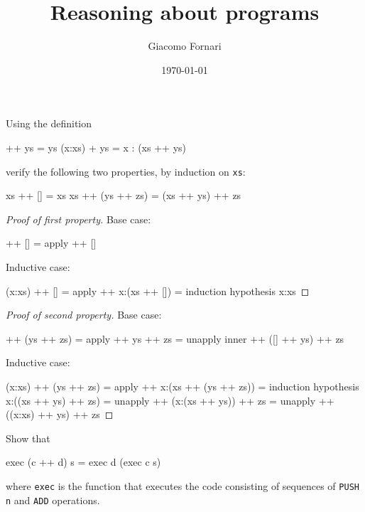 \documentclass[12pt]{article}
\title{Reasoning about programs}
\author{Giacomo Fornari}
\date{\today}
\newenvironment{code}{\endgraf\verbatim}{\endverbatim}
\newenvironment{problem}[2][Problem]{\begin{trivlist}
\item[\hskip \labelsep {\bfseries #1}\hskip \labelsep {\bfseries #2.}]}{\end{trivlist}}
\begin{document}
\maketitle


\begin{problem}{1}
Using the definition

\begin{code}
[] ++ ys = ys
(x:xs) + ys = x : (xs ++ ys)
\end{code}

verify the following two properties, by induction on \verb|xs|:

\begin{code}
xs ++ [] = xs
xs ++ (ys ++ zs) = (xs ++ ys) ++ zs
\end{code}
\end{problem}


\begin{proof}[Proof of first property]
Base case:

\begin{code}
  [] ++ []
=   { apply ++ }
  []
\end{code}

Inductive case:

\begin{code}
  (x:xs) ++ []
=   { apply ++ }
  x:(xs ++ [])
=   { induction hypothesis }
  x:xs
\end{code}
\end{proof}


\begin{proof}[Proof of second property]
Base case:

\begin{code}
  [] ++ (ys ++ zs)
=   { apply ++ }
  ys ++ zs
=   { unapply inner ++ }
  ([] ++ ys) ++ zs
\end{code}

Inductive case:

\begin{code}
  (x:xs) ++ (ys ++ zs)
=   { apply ++ }
  x:(xs ++ (ys ++ zs))
=   { induction hypothesis }
  x:((xs ++ ys) ++ zs)
=   { unapply ++ }
  (x:(xs ++ ys)) ++ zs
=   { unapply ++ }
  ((x:xs) ++ ys) ++ zs
\end{code}
\end{proof}


\begin{problem}{2}
Show that

\begin{code}
exec (c ++ d) s = exec d (exec c s)
\end{code}

where \verb|exec| is the function that executes the code consisting of sequences of \verb|PUSH n| and \verb|ADD| operations.
\end{problem}
\end{document}
